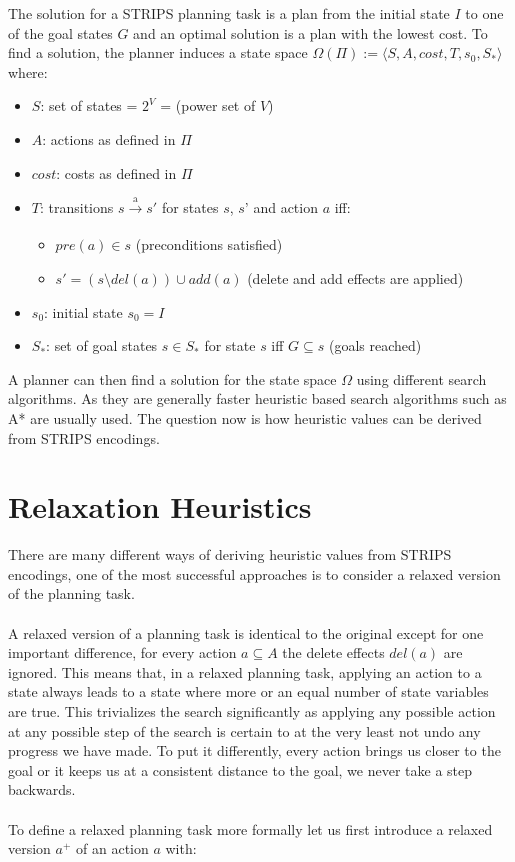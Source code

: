The solution for a STRIPS planning task is a plan from the initial state $I$ to one of the goal states $G$ and an optimal solution is a plan with the lowest cost. To find a solution, the planner induces a state space $\Omega(\Pi) := \langle S,A,cost,T,s_0,S_* \rangle$ where:

\begin{itemize}
\setlength\itemsep{0em}
\item $S$: set of states = $2^V$ = (power set of $V$)
\item $A$: actions as defined in $\Pi$ 
\item $cost$: costs as defined in $\Pi$ 
\item $T$: transitions $s \xrightarrow[\text{}]{\text{a}} s'$ for states $s$, $s’$ and action $a$ iff: 
\begin{itemize}
\setlength\itemsep{0em}
\item $pre(a) \in s$ (preconditions satisfied)
\item $s' = (s \setminus del(a)) \cup add(a)$ (delete and add effects are applied)
\end{itemize}
\item $s_0$: initial state $s_0 = I$
\item $S_*$: set of goal states $s \in S_*$ for state $s$ iff $G \subseteq s$ (goals reached) \quad\quad\quad\quad\quad\quad\quad
\end{itemize}
 
A planner can then find a solution for the state space $\Omega$ using different search algorithms. As they are generally faster heuristic based search algorithms such as A* are usually used. The question now is how heuristic values can be derived from STRIPS encodings. 



\section{Relaxation Heuristics}

There are many different ways of deriving heuristic values from STRIPS encodings, one of the most successful approaches is to consider a relaxed version of the planning task. \\\\
A relaxed version of a planning task is identical to the original except for one important difference, for every action $a \subseteq A$ the delete effects $del(a)$ are ignored. This means that, in a relaxed planning task, applying an action to a state always leads to a state where more or an equal number of state variables are true. This trivializes the search significantly as applying any possible action at any possible step of the search is certain to at the very least not undo any progress we have made. To put it differently, every action brings us closer to the goal or it keeps us at a consistent distance to the goal, we never take a step backwards. \\\\
To define a relaxed planning task more formally let us first introduce a relaxed version $a^+$ of an action $a$ with: 

